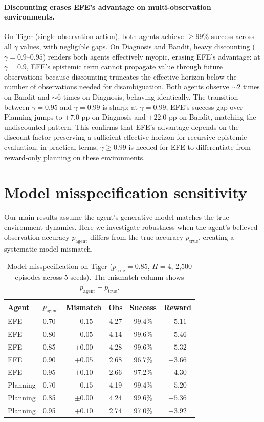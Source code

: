 \documentclass{article}
\begin{document}
\paragraph{Discounting erases EFE's advantage on multi-observation environments.} On Tiger (single observation action), both agents achieve ${\geq}99\%$ success across all $\gamma$ values, with negligible gaps. On Diagnosis and Bandit, heavy discounting ($\gamma{=}0.9$--$0.95$) renders both agents effectively myopic, erasing EFE's advantage: at $\gamma{=}0.9$, EFE's epistemic term cannot propagate value through future observations because discounting truncates the effective horizon below the number of observations needed for disambiguation. Both agents observe ${\sim}2$ times on Bandit and ${\sim}6$ times on Diagnosis, behaving identically. The transition between $\gamma{=}0.95$ and $\gamma{=}0.99$ is sharp: at $\gamma{=}0.99$, EFE's success gap over Planning jumps to $+7.0$ pp on Diagnosis and $+22.0$ pp on Bandit, matching the undiscounted pattern. This confirms that EFE's advantage depends on the discount factor preserving a sufficient effective horizon for recursive epistemic evaluation; in practical terms, $\gamma \geq 0.99$ is needed for EFE to differentiate from reward-only planning on these environments.

\section{Model misspecification sensitivity}
\label{app:misspec}

Our main results assume the agent's generative model matches the true environment dynamics. Here we investigate robustness when the agent's believed observation accuracy $p_{\text{agent}}$ differs from the true accuracy $p_{\text{true}}$, creating a systematic model mismatch.

\begin{table}[h]
\centering
\caption{Model misspecification on Tiger ($p_{\text{true}}{=}0.85$, $H{=}4$, 2{,}500 episodes across 5 seeds). The mismatch column shows $p_{\text{agent}} - p_{\text{true}}$.}
\label{tab:misspec-tiger}
\begin{small}
\begin{tabular}{llcccc}
\toprule
Agent & $p_{\text{agent}}$ & Mismatch & Obs & Success & Reward \\
\midrule
EFE & 0.70 & $-0.15$ & 4.27 & 99.4\% & $+5.11$ \\
EFE & 0.80 & $-0.05$ & 4.14 & 99.6\% & $+5.46$ \\
EFE & 0.85 & $\pm 0.00$ & 4.28 & 99.6\% & $+5.32$ \\
EFE & 0.90 & $+0.05$ & 2.68 & 96.7\% & $+3.66$ \\
EFE & 0.95 & $+0.10$ & 2.66 & 97.2\% & $+4.30$ \\
\midrule
Planning & 0.70 & $-0.15$ & 4.19 & 99.4\% & $+5.20$ \\
Planning & 0.85 & $\pm 0.00$ & 4.24 & 99.6\% & $+5.36$ \\
Planning & 0.95 & $+0.10$ & 2.74 & 97.0\% & $+3.92$ \\
\bottomrule
\end{tabular}
\end{small}
\end{table}
\end{document}
